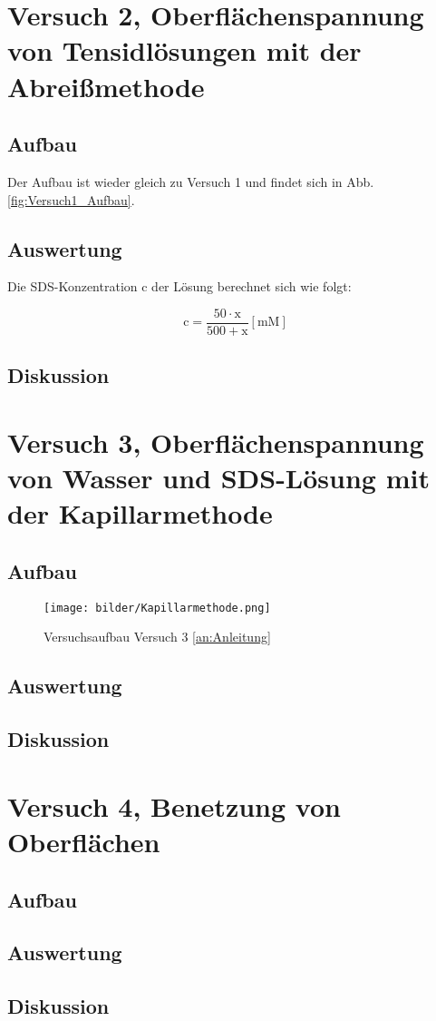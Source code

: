         \section{Versuch 2, Oberflächenspannung von Tensidlösungen mit der Abreißmethode}

        \subsection{Aufbau}
        Der Aufbau ist wieder gleich zu Versuch 1 und findet sich in Abb. \ref{fig:Versuch1_Aufbau}. 

        \subsection{Auswertung}
        Die SDS-Konzentration $\mathrm{c}$ der Lösung berechnet sich wie folgt:

        \begin{equation}
            \mathrm{c} = \frac{50 \cdot \mathrm{x}}{500  + \mathrm{x} }\mathrm{[mM]}
            \label{eq:Konzentration}
        \end{equation}
        \subsection{Diskussion}

        \section{Versuch 3, Oberflächenspannung von Wasser und SDS-Lösung mit der Kapillarmethode}

       \subsection{Aufbau}
        
       \begin{figure}[H]
           \centering
           \texttt{[image: bilder/Kapillarmethode.png]}
           \caption{Versuchsaufbau Versuch 3 \ref{an:Anleitung}}
           \label{fig:Versuch3_Aufbau}
         \end{figure}
       \subsection{Auswertung}
         \subsection{Diskussion}

         \section{Versuch 4, Benetzung von Oberflächen}

         \subsection{Aufbau}
            \subsection{Auswertung}
            \subsection{Diskussion}
